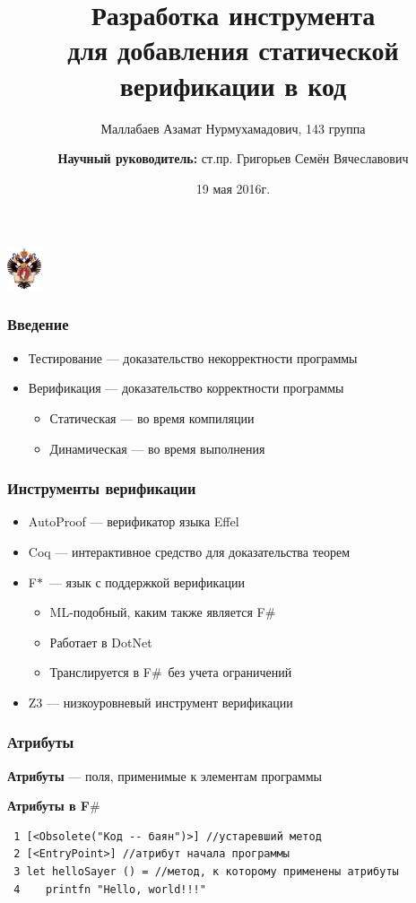 \documentclass{beamer}
\title[Верификация в коде]{Разработка инструмента\\
        для добавления статической верификации в код}
\institute[СПбГУ]{
Санкт-Петербургский государственный университет } %
\author[Маллабаев Азамат]{Маллабаев Азамат Нурмухамадович, 143 группа \\
  \and
    {\bfseries Научный руководитель:} ст.пр. Григорьев Семён Вячеславович}
\date{19 мая 2016г.}
\def \fstar {F$\ast$}
\def \fsharp {F$\#$}
\begin{document}
{
\begin{frame}
  \begin{center}
  {\includegraphics[width=1cm]{pictures/SPbGU_Logo.png}}
  \end{center}
  \titlepage
\end{frame}
}
            
\begin{frame}
  \transwipe[direction=90]
  \frametitle{Введение}
  \begin{itemize}
    \item Тестирование --- доказательство некорректности программы
    \item Верификация --- доказательство корректности программы
    \begin{itemize}
       \item Статическая --- во время компиляции
       \item Динамическая --- во время выполнения
    \end{itemize}
  \end{itemize}
\end{frame}

\begin{frame}
  \transwipe[direction=90]
  \frametitle{Инструменты верификации}
  \begin{itemize}
    \item AutoProof --- верификатор языка Effel
    \item Coq --- интерактивное средство для доказательства теорем
    \item \fstar~--- язык с поддержкой верификации
    \begin{itemize}
      \item ML-подобный, каким также является \fsharp
      \item Работает в DotNet
      \item Транслируется в \fsharp~без учета ограничений
    \end{itemize}
    \item Z3 --- низкоуровневый инструмент верификации
  \end{itemize}
\end{frame}

\begin{frame}[fragile]
  \transwipe[direction=90]
  \frametitle{Атрибуты}
  \textbf {Атрибуты} --- поля, применимые к элементам программы
  
  \textbf {}
  
  \textbf{Атрибуты в \fsharp}
  \begin{verbatim}
 1 [<Obsolete("Код -- баян")>] //устаревший метод
 2 [<EntryPoint>] //атрибут начала программы
 3 let helloSayer () = //метод, к которому применены атрибуты
 4    printfn "Hello, world!!!"
  \end{verbatim}
\end{frame}
\end{document}
